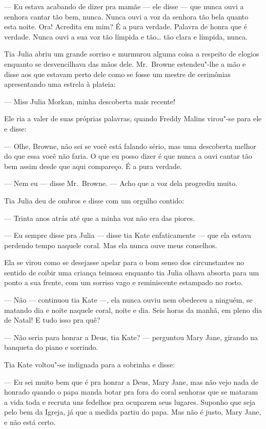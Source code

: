 --- Eu estava acabando de dizer pra mamãe --- ele disse --- que nunca ouvi a
senhora cantar tão bem, nunca.  Nunca ouvi a voz da senhora tão bela quanto
esta noite.  Ora!  Acredita em mim?  É a pura verdade.  Palavra de honra que é
verdade.  Nunca ouvi a sua voz tão límpida e tão\ldots{} tão clara e límpida,
nunca.

Tia Julia abriu um grande sorriso e murmurou alguma coisa a respeito de elogios
enquanto se desvencilhava das mãos dele.  Mr.~Browne estendeu"-lhe a mão e disse
aos que estavam perto dele como se fosse um mestre de cerimônias apresentando
uma estrela à plateia:

--- Miss Julia Morkan, minha descoberta mais recente!

Ele ria a valer de suas próprias palavras, quando Freddy Malins virou"-se para
ele e disse:

--- Olhe, Browne, não sei se você está falando sério, mas uma descoberta melhor
do que essa você não faria.  O que eu posso dizer é que nunca a ouvi cantar tão
bem assim desde que aqui compareço.  É a pura verdade.

--- Nem eu --- disse Mr.~Browne.  --- Acho que a voz dela progrediu muito.

Tia Julia deu de ombros e disse com um orgulho contido:

--- Trinta anos atrás até que a minha voz não era das piores.

--- Eu sempre disse pra Julia --- disse tia Kate enfaticamente --- que ela
estava perdendo tempo naquele coral.  Mas ela nunca ouve meus conselhos.

Ela se virou como se desejasse apelar para o bom senso dos circunstantes no
sentido de coibir uma criança teimosa enquanto tia Julia olhava absorta para um
ponto a sua frente, com um sorriso vago e reminiscente estampado no rosto.

--- Não --- continuou tia Kate ---, ela nunca ouviu nem obedeceu a ninguém, se
matando dia e noite naquele coral, noite e dia.  Seis horas da manhã, em pleno
dia de Natal!  E tudo isso pra quê?

--- Não seria para honrar a Deus, tia Kate? --- perguntou Mary Jane, girando na
banqueta do piano e sorrindo.

Tia Kate voltou"-se indignada para a sobrinha e disse:

--- Eu sei muito bem que é pra honrar a Deus, Mary Jane, mas não vejo nada de
honrado quando o papa manda botar pra fora do coral senhoras que se mataram a
vida toda e recruta uns fedelhos pra ocuparem seus lugares.  Suponho que seja
pelo bem da Igreja, já que a medida partiu do papa.  Mas não é justo, Mary
Jane, e não está certo.

